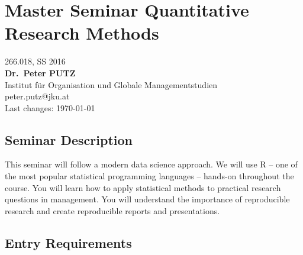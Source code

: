 \documentclass[]{article}
\date{}
\begin{document}

\centering

\section{Master Seminar Quantitative Research
Methods}\label{master-seminar-quantitative-research-methods}

266.018, SS 2016\\
\textbf{Dr.~Peter PUTZ}\\
Institut für Organisation und Globale Managementstudien\\
peter.putz@jku.at\\
Last changes: \today

\raggedright

\subsection{Seminar Description}\label{seminar-description}

This seminar will follow a modern data science approach. We will use R
-- one of the most popular statistical programming languages -- hands-on
throughout the course. You will learn how to apply statistical methods
to practical research questions in management. You will understand the
importance of reproducible research and create reproducible reports and
presentations.

\subsection{Entry Requirements}\label{entry-requirements}
\end{document}

